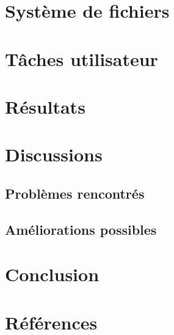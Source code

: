 \documentclass[a4paper, 12pt]{article}
\begin{document}
\section{Système de fichiers}


\newpage

\section{Tâches utilisateur}


\newpage

\section{Résultats}

\newpage

\section{Discussions}
\subsection{Problèmes rencontrés}


\subsection{Améliorations possibles}

\newpage

\section{Conclusion}

\newpage

\section{Références}
\nocite{*}


\end{document}
